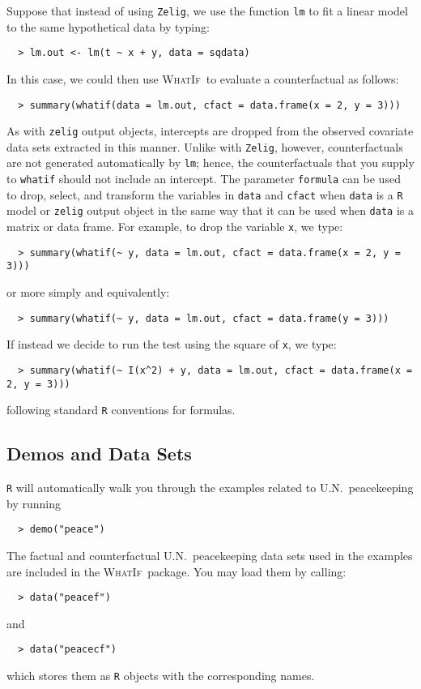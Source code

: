 \documentclass[oneside,letterpaper,titlepage]{article}
\newcommand{\WhatIf}{\textsc{WhatIf}}
\begin{document}
Suppose that instead of using \texttt{Zelig}, we use the function
\texttt{lm} to fit a linear model to the same hypothetical data
by typing:
\begin{verbatim}
  > lm.out <- lm(t ~ x + y, data = sqdata)
\end{verbatim}
In this case, we could then use \WhatIf\ to evaluate a counterfactual
as follows:
\begin{verbatim}
  > summary(whatif(data = lm.out, cfact = data.frame(x = 2, y = 3)))
\end{verbatim}
As with \texttt{zelig} output objects, intercepts are dropped from the
observed covariate data sets extracted in this manner.  Unlike with
\texttt{Zelig}, however, counterfactuals are not generated
automatically by \texttt{lm}; hence, the counterfactuals that you
supply to \texttt{whatif} should not include an intercept.  The
parameter \texttt{formula} can be used to drop, select, and transform
the variables in \texttt{data} and \texttt{cfact} when \texttt{data}
is a \texttt{R} model or \texttt{zelig} output object in the same way
that it can be used when \texttt{data} is a matrix or data frame.  For
example, to drop the variable \texttt{x}, we type:
\begin{verbatim}
  > summary(whatif(~ y, data = lm.out, cfact = data.frame(x = 2, y = 3)))
\end{verbatim}
or more simply and equivalently:
\begin{verbatim}
  > summary(whatif(~ y, data = lm.out, cfact = data.frame(y = 3)))
\end{verbatim}
If instead we decide to run the test using the square of \texttt{x}, we type:
\begin{verbatim}
  > summary(whatif(~ I(x^2) + y, data = lm.out, cfact = data.frame(x = 2, y = 3)))
\end{verbatim}
following standard \texttt{R} conventions for formulas.

\subsection{Demos and Data Sets}

\texttt{R} will automatically walk you through the examples related to
U.N.\ peacekeeping by running
  \begin{verbatim}
  > demo("peace")
  \end{verbatim}
The factual and counterfactual U.N.\ peacekeeping data sets used in
the examples are included in the \WhatIf\ package.  You may load them
by calling:
  \begin{verbatim}
  > data("peacef")
  \end{verbatim}
and
  \begin{verbatim}
  > data("peacecf")
  \end{verbatim}
which stores them as \texttt{R} objects with the corresponding names.
\end{document}
